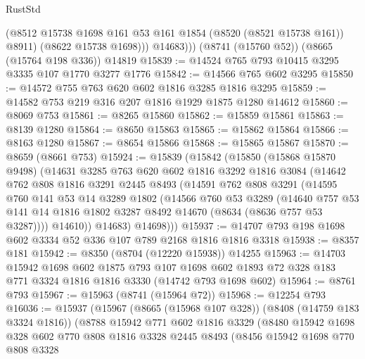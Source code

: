 \begin{lexlean}{RustStd}
\begin{coremodule}
              (@8512 @15738 @1698 @161 @53 @161 @1854 (@8520 (@8521 @15738 @161)) @8911)
              (@8622 @15738 @1698)))
          @14683)))
    (@8741 (@15760 @52))
    (@8665 (@15764 @198 @336))
    @14819
@15839 := @14524 @765 @793 @10415 @3295 @3335 @107 @1770 @3277 @1776
@15842 := @14566 @765 @602 @3295
@15850 := @14572 @755 @763 @620 @602 @1816 @3285 @1816 @3295
@15859 := @14582 @753 @219 @316 @207 @1816 @1929 @1875 @1280 @14612
@15860 := @8069 @753
@15861 := @8265 @15860
@15862 := @15859 @15861
@15863 := @8139 @1280
@15864 := @8650 @15863
@15865 := @15862 @15864
@15866 := @8163 @1280
@15867 := @8654 @15866
@15868 := @15865 @15867
@15870 := @8659 (@8661 @753)
@15924 := @15839
    (@15842
      (@15850
        (@15868 @15870 @9498)
        (@14631
          @3285
          @763
          @620
          @602
          @1816
          @3292
          @1816
          @3084
          (@14642
            @762
            @808
            @1816
            @3291
            @2445
            @8493
            (@14591
              @762
              @808
              @3291
              (@14595
                @760
                @141
                @53
                @14
                @3289
                @1802
                (@14566
                  @760
                  @53
                  @3289
                  (@14640
                    @757
                    @53
                    @141
                    @14
                    @1816
                    @1802
                    @3287
                    @8492
                    @14670
                    (@8634 (@8636 @757 @53 @3287))))
                @14610))
            @14683)
          @14698)))
@15937 := @14707 @793 @198 @1698 @602 @3334 @52 @336 @107 @789 @2168 @1816 @1816 @3318
@15938 := @8357 @181
@15942 := @8350 (@8704 (@12220 @15938)) @14255
@15963 := @14703
    @15942
    @1698
    @602
    @1875
    @793
    @107
    @1698
    @602
    @1893
    @72
    @328
    @183
    @771
    @3324
    @1816
    @1816
    @3330
    (@14742 @793 @1698 @602)
@15964 := @8761 @793
@15967 := @15963 (@8741 (@15964 @72))
@15968 := @12254 @793
@16036 := @15937
    (@15967
      (@8665 (@15968 @107 @328))
      (@8408 (@14759 @183 @3324 @1816))
      (@8788
        @15942
        @771
        @602
        @1816
        @3329
        (@8480
          @15942
          @1698
          @328
          @602
          @770
          @808
          @1816
          @3328
          @2445
          @8493
          (@8456
            @15942
            @1698
            @770
            @808
            @3328

\end{coremodule}
\end{lexlean}

